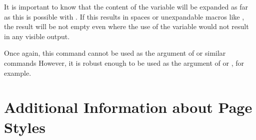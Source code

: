 \begin{Declaration}
\end{Declaration}
It is important to know that the content of the variable will be expanded as
far as this is possible with . If this results in spaces or
unexpandable macros like , the result will be not empty even
where the use of the variable would not result in any visible output.

Once again, this command cannot be used as the argument
of  or similar commands However,
it is robust enough to be used as the argument of
 or , for
example.%
%
\EndIndexGroup
%
\EndIndexGroup


\section{Additional Information about Page Styles}
\BeginIndexGroup
{}

%
\EndIndexGroup

\iffalse%
\section{Differences in How \Package{scrletter} Handles \File{lco} Files}
\seclabel{lcoatscrletter}
\BeginIndexGroup
\BeginIndex{File}{lco}
\BeginIndex{}{lco file=\File{lco} file}

As\ChangedAt{v3.15}{\Package{scrletter}} explained in
\autoref{sec:scrlttr2.lcoFile}, \Class{scrlttr2} can load \File{lco} files via
the optional argument of \Macro{documentclass}. The \Package{scrletter} package
does not support this.

\begin{Declaration}
  \Macro{LoadLetterOption}\Parameter{name}%
  \Macro{LoadLetterOptions}\Parameter{list of names}
\end{Declaration}
For \Class{scrlttr2}, load \File{lco} files with
\DescRef{scrlttr2.cmd.LoadLetterOption} or
\DescRef{scrlttr2.cmd.LoadLetterOptions} is only a recommendation. For
\Package{scrletter}, it is mandatory. Of course, you can only load the
\File{lco} files after you load \Package{scrletter}.
%
\EndIndexGroup
%
\EndIndexGroup
\fi


